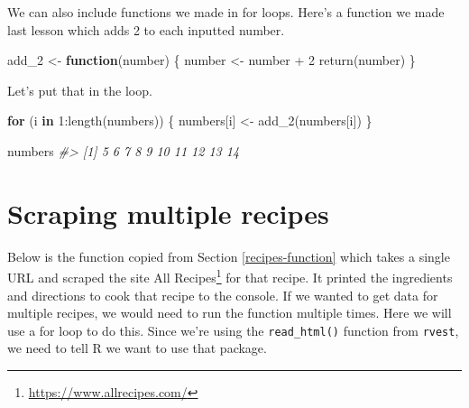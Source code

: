 \documentclass[
]{krantz}
\makeatletter
\newenvironment{Shaded}{\begin{snugshade}}{\end{snugshade}}
\newcommand{\CommentTok}[1]{\textcolor[rgb]{0.37,0.37,0.37}{\textit{#1}}}
\newcommand{\ControlFlowTok}[1]{\textcolor[rgb]{0.27,0.27,0.27}{\textbf{#1}}}
\newcommand{\DecValTok}[1]{\textcolor[rgb]{0.06,0.06,0.06}{#1}}
\newcommand{\FunctionTok}[1]{\textcolor[rgb]{0,0,0}{#1}}
\newcommand{\NormalTok}[1]{#1}
\newcommand{\OtherTok}[1]{\textcolor[rgb]{0.37,0.37,0.37}{#1}}
\newcommand{\SpecialCharTok}[1]{\textcolor[rgb]{0,0,0}{#1}}
\renewcommand{\href}[2]{#2\footnote{\url{#1}}}
\newenvironment{kframe}{%
\medskip{}
\setlength{\fboxsep}{.8em}
 \def\at@end@of@kframe{}%
 \ifinner\ifhmode%
  \def\at@end@of@kframe{\end{minipage}}%
  \begin{minipage}{\columnwidth}%
 \fi\fi%
 \def\FrameCommand##1{\hskip\@totalleftmargin \hskip-\fboxsep
 \colorbox{shadecolor}{##1}\hskip-\fboxsep
     \hskip-\linewidth \hskip-\@totalleftmargin \hskip\columnwidth}%
 \MakeFramed {\advance\hsize-\width
   \@totalleftmargin\z@ \linewidth\hsize
   \@setminipage}}%
 {\par\unskip\endMakeFramed%
 \at@end@of@kframe}
\renewenvironment{Shaded}{\begin{kframe}}{\end{kframe}}
\makeatother
\begin{document}
We can also include functions we made in for loops. Here's a function we made last lesson which adds 2 to each inputted number.

\begin{Shaded}
\begin{Highlighting}[]
\NormalTok{add\_2 }\OtherTok{\textless{}{-}} \ControlFlowTok{function}\NormalTok{(number) \{}
\NormalTok{  number }\OtherTok{\textless{}{-}}\NormalTok{ number }\SpecialCharTok{+} \DecValTok{2}
  \FunctionTok{return}\NormalTok{(number)}
\NormalTok{\}}
\end{Highlighting}
\end{Shaded}

Let's put that in the loop.

\begin{Shaded}
\begin{Highlighting}[]
\ControlFlowTok{for}\NormalTok{ (i }\ControlFlowTok{in} \DecValTok{1}\SpecialCharTok{:}\FunctionTok{length}\NormalTok{(numbers)) \{}
\NormalTok{  numbers[i] }\OtherTok{\textless{}{-}} \FunctionTok{add\_2}\NormalTok{(numbers[i])}
\NormalTok{\}}
\end{Highlighting}
\end{Shaded}

\begin{Shaded}
\begin{Highlighting}[]
\NormalTok{numbers}
\CommentTok{\#\textgreater{}  [1]  5  6  7  8  9 10 11 12 13 14}
\end{Highlighting}
\end{Shaded}

\hypertarget{scraping-multiple-recipes}{%
\section{Scraping multiple recipes}\label{scraping-multiple-recipes}}

Below is the function copied from Section \ref{recipes-function} which takes a single URL and scraped the site \href{https://www.allrecipes.com/}{All Recipes} for that recipe. It printed the ingredients and directions to cook that recipe to the console. If we wanted to get data for multiple recipes, we would need to run the function multiple times. Here we will use a for loop to do this. Since we're using the \texttt{read\_html()} function from \texttt{rvest}, we need to tell R we want to use that package.
\end{document}
